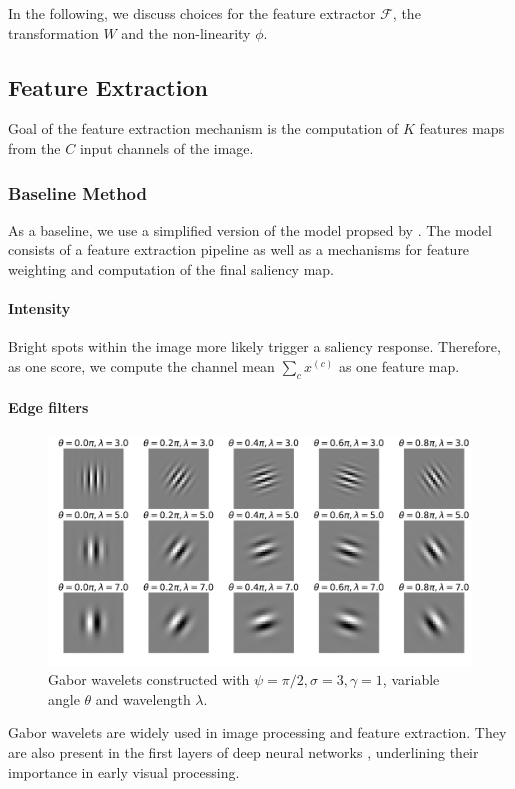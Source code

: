 \documentclass[a4paper,twocolumn,10pt]{article}
\newcommand{\F}{\mathcal{F}}
\begin{document}
In the following, we discuss choices for the feature extractor $\F$, the transformation $W$ and the non-linearity $\phi$.

\subsection{Feature Extraction}

Goal of the feature extraction mechanism is the computation of $K$ features maps from the $C$ input channels of the image.

\subsubsection{Baseline Method}

As a baseline, we use a simplified version of the model propsed by \cite{IttyKoch2000}.
The model consists of a feature extraction pipeline as well as a mechanisms for feature weighting and computation of the final saliency map.

\paragraph{Intensity}

Bright spots within the image more likely trigger a saliency response.
Therefore, as one score, we compute the channel mean $\sum_c x^{(c)}$ as one feature map.

\paragraph{Edge filters}

\begin{figure}[t]
  \includegraphics[width=.5\textwidth]{fig/gabor.pdf}
  \caption{\small Gabor wavelets constructed with $\psi=\pi/2,\sigma=3,\gamma=1$, variable angle $\theta$ and wavelength $\lambda$.}
  \label{fig:gabor}
\end{figure}

Gabor wavelets \cite{gabor} are widely used in image processing and feature extraction.
They are also present in the first layers of deep neural networks \cite{}, underlining their importance in early visual processing.
\end{document}
